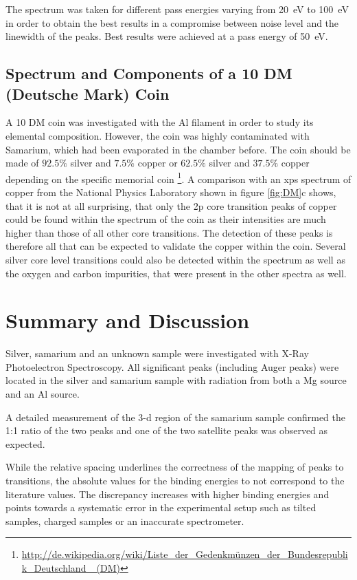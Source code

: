 \documentclass[a4paper]{scrartcl}
\numberwithin{equation}{section}
\numberwithin{figure}{section}
\numberwithin{table}{section}
\begin{document}
The spectrum was taken for different pass energies varying from \SI{20}{eV} to \SI{100}{eV} in order to obtain the best results in a compromise between noise level and the linewidth of the peaks. Best results were achieved at a pass energy of \SI{50}{eV}.  


\subsection{Spectrum and Components of a 10 DM (Deutsche Mark) Coin}
A 10 DM coin was investigated with the Al filament in order to study its elemental composition. However, the coin was highly contaminated with Samarium, which had been evaporated in the chamber before. The coin should be made of $92.5 \%$ silver and $7.5\%$ copper or $62.5 \%$ silver and $37.5 \%$ copper depending on the specific memorial coin \footnote{\url{http://de.wikipedia.org/wiki/Liste_der_Gedenkmünzen_der_Bundesrepublik_Deutschland _(DM)}}. A comparison with an xps spectrum of copper from the National Physics Laboratory \cite{npl} shown in figure \ref{fig:DM}c shows, that it is not at all surprising, that only the 2p core transition peaks of copper could be found within the spectrum of the coin as their intensities are much higher than those of all other core transitions. The detection of these peaks is therefore all that can be expected to validate the copper within the coin. Several silver core level transitions could also be detected within the spectrum as well as the oxygen and carbon impurities, that were present in the other spectra as well.


\section{Summary and Discussion}
Silver, samarium and an unknown sample were investigated with X-Ray Photoelectron Spectroscopy. All significant peaks (including Auger peaks) were located in the silver and samarium sample with radiation from both a Mg source and an Al source.

A detailed measurement of the 3-d region of the samarium sample confirmed the 1:1 ratio of the two peaks and one of the two satellite peaks was observed as expected.

While the relative spacing underlines the correctness of the mapping of peaks to transitions, the absolute values for the binding energies to not correspond to the literature values. The discrepancy increases with higher binding energies and points towards a systematic error in the experimental setup such as tilted samples, charged samples or an inaccurate spectrometer.
\end{document}
